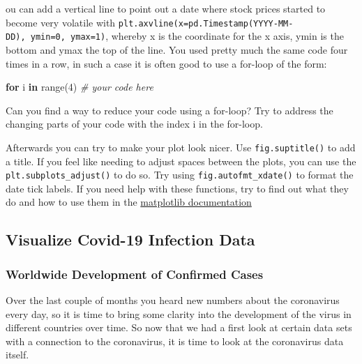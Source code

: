 \documentclass[
  11pt,
]{article}
\newenvironment{Shaded}{\begin{snugshade}}{\end{snugshade}}
\newcommand{\BuiltInTok}[1]{#1}
\newcommand{\CommentTok}[1]{\textcolor[rgb]{0.56,0.35,0.01}{\textit{#1}}}
\newcommand{\ControlFlowTok}[1]{\textcolor[rgb]{0.13,0.29,0.53}{\textbf{#1}}}
\newcommand{\DecValTok}[1]{\textcolor[rgb]{0.00,0.00,0.81}{#1}}
\newcommand{\KeywordTok}[1]{\textcolor[rgb]{0.13,0.29,0.53}{\textbf{#1}}}
\newcommand{\NormalTok}[1]{#1}
\newenvironment{tipsp}[1]
  {
  \begin{itemize}
  \footnotesize
  \renewcommand{\labelitemi}{
    \raisebox{-.7\height}[0pt][0pt]{
      {\setkeys{Gin}{width=3em,keepaspectratio}
        \texttt{[image: images/\#1.png]}}
    }
  }
  \setlength{\fboxsep}{1em}
  \begin{pbox}
  \item
  }
  {
  \end{pbox}
  \end{itemize}
  }
\begin{document}
\begin{tipsp}
You can add a vertical line to point out a date where stock prices started to become very volatile with \texttt{plt.axvline(x=pd.Timestamp(\textquotesingle{}YYYY-MM-DD\textquotesingle{}),\ ymin=0,\ ymax=1)}, whereby x is the coordinate for the x axis, ymin is the bottom and ymax the top of the line.
You used pretty much the same code four times in a row, in such a case it is often good to use a for-loop of the form:

\begin{Shaded}
\begin{Highlighting}[]
\ControlFlowTok{for}\NormalTok{ i }\KeywordTok{in} \BuiltInTok{range}\NormalTok{(}\DecValTok{4}\NormalTok{)}
    \CommentTok{\# your code here}
\end{Highlighting}
\end{Shaded}

Can you find a way to reduce your code using a for-loop? Try to address the changing parts of your code with the index i in the for-loop.

Afterwards you can try to make your plot look nicer.
Use \texttt{fig.suptitle()} to add a title.
If you feel like needing to adjust spaces between the plots, you can use the \texttt{plt.subplots\_adjust()} to do so.
Try using \texttt{fig.autofmt\_xdate()} to format the date tick labels. If you need help with these functions, try to find out what they do and how to use them in the \href{https://matplotlib.org/3.2.1/contents.html}{matplotlib documentation}

\end{tipsp}

\hypertarget{visualize-covid-19-infection-data}{%
\subsection{Visualize Covid-19 Infection Data}\label{visualize-covid-19-infection-data}}

\hypertarget{worldwide-development-of-confirmed-cases}{%
\subsubsection{Worldwide Development of Confirmed Cases}\label{worldwide-development-of-confirmed-cases}}

Over the last couple of months you heard new numbers about the coronavirus every day, so it is time to bring some clarity into the development of the virus in different countries over time. So now that we had a first look at certain data sets with a connection to the coronavirus, it is time to look at the coronavirus data itself.
\end{document}
